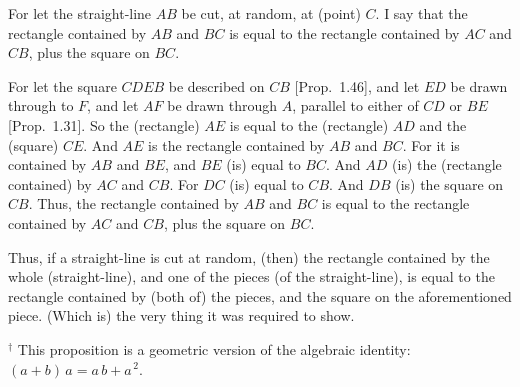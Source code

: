 \begin{Parallel}{}{}
{
\centerline{}

For let the straight-line $AB$ be cut, at random, at (point) $C$.
I say that the rectangle contained by $AB$ and $BC$ is equal to the
rectangle contained by $AC$ and $CB$, plus the square on $BC$.

For let the square $CDEB$ be described on $CB$ [Prop.~1.46],
and let $ED$ be drawn through to $F$, and let $AF$ be
drawn through $A$, parallel to either of $CD$ or $BE$ [Prop.~1.31].
So the (rectangle) $AE$ is equal to the (rectangle) $AD$ and the (square) $CE$.
And $AE$ is the rectangle contained by $AB$ and $BC$.
For it is contained by $AB$ and $BE$, and $BE$ (is) equal to $BC$. And
$AD$ (is) the (rectangle contained) by $AC$ and $CB$. For $DC$
(is) equal to $CB$. And $DB$ (is) the square on $CB$. Thus, the rectangle
contained by $AB$ and $BC$ is equal to the rectangle contained by $AC$ and
$CB$, plus the square on $BC$.

Thus, if a straight-line is cut at random, (then) the rectangle contained by the
whole (straight-line),  and one of the pieces (of the straight-line),
is equal to the rectangle contained by (both of) the pieces, and the square on
the aforementioned piece. (Which is) the very thing it was required
to show.}
\end{Parallel}
{\footnotesize \noindent$^\dag$ This proposition is a geometric version
of the algebraic identity: $(a+b)\,a = a\,b + a^{\,2}$.}

